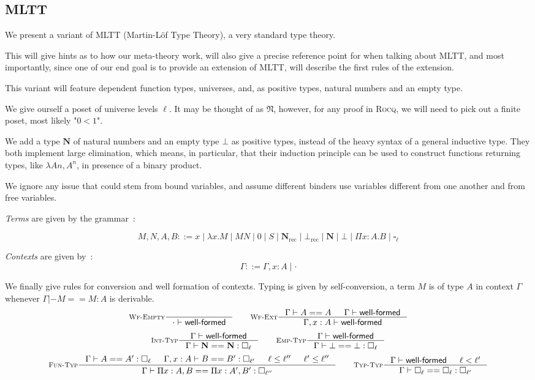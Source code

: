 \documentclass[11pt]{article}
\DeclareMathOperator{\rec}{rec}
\newcommand{\0}{\mathbf{0}}
\newcommand{\1}{\mathbf{1}}
\newcommand{\nat}{\mathbf{N}}
\newcommand{\mnat}{\mathfrak{N}}
\newcommand{\tctx}{\Gamma}
\newcommand{\Wf}{\textsf{well-formed}}
\newcommand{\rocq}{\textsc{Rocq}}
\begin{document}
\subsection{MLTT}
We present a variant of MLTT (Martin-Löf Type Theory), a very standard type theory.

This will give hints as to how our meta-theory work, will also give a precise reference point for when talking about MLTT, and most importantly, since one of our end goal is to provide an extension of MLTT, will describe the first rules of the extension.

This variant will feature dependent function types, universes, and, as positive types, natural numbers and an empty type.

We give ourself a poset of universe levels $\ell$. It may be thought of as $\mnat$, however, for any proof in \rocq, we will need to pick out a finite poset, most likely "$0 < 1$".

We add a type $\nat$ of natural numbers and an empty type $\bot$ as positive types, instead of the heavy syntax of a general inductive type.
They both implement large elimination, which means, in particular, that their induction principle can be used to construct functions returning types, like $\lambda A n, A^n$, in presence of a binary product.

We ignore any issue that could stem from bound variables, and assume different binders use variables different from one another and from free variables.

\emph{Terms} are given by the grammar~:

$$ M,N,A,B ::= x \mid \lambda x. M \mid MN \mid 0 \mid S \mid \nat_{\rec} \mid \bot_{\rec} \mid \nat \mid \bot \mid \Pi x :A.B \mid \square_\ell $$


\emph{Contexts} are given by~:
$$ \tctx ::= \tctx, x : A \mid \cdot $$

We finally give rules for conversion and well formation of contexts. Typing is given by self-conversion, a term $M$ is of type $A$ in context $\Gamma$ whenever $\Gamma |- M == M : A$ is derivable.
$$
    \inference[\textsc{Wf-Empty}]{}{\cdot |- \Wf} \qquad
    \inference[\textsc{Wf-Ext}]{\tctx |- A == A & \tctx |- \Wf}{ \tctx, x : A |- \Wf}
$$
$$
    \inference[\textsc{Int-Typ}]{\tctx |- \Wf}{\tctx |- \nat == \nat : \square_\ell} \qquad
    \inference[\textsc{Emp-Typ}]{\tctx |- \Wf}{\tctx |- \bot == \bot : \square_\ell}
$$
$$
    \inference[\textsc{Fun-Typ}]{\tctx |- A == A' : \square_\ell & \tctx, x : A |- B == B' : \square_{\ell'} & \ell \leq \ell'' & \ell' \leq \ell''}{\tctx |- \Pi x  : A, B == \Pi x: A', B' : \square_{\ell''}} \qquad
    \inference[\textsc{Typ-Typ}]{\tctx |- \Wf & \ell < \ell' }{\tctx |- \square_\ell == \square_\ell: \square_{\ell'}}
$$
\end{document}
